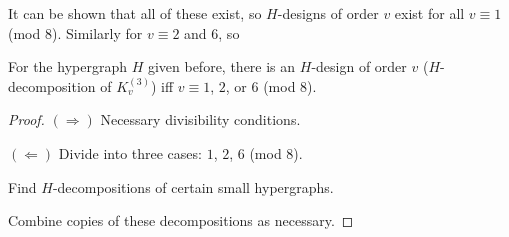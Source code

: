\begin{frame}
\begin{center}
\end{center}

\end{frame}

\begin{frame}

It can be shown that all of these exist, so $H$-designs of order $v$ exist for
all $v \equiv 1$ (mod $8$). Similarly for $v \equiv 2$ and $6$, so

\pause

\begin{theorem}
For the hypergraph $H$ given before, there is an $H$-design of order $v$
($H$-decomposition of $K_v^{(3)}$) iff $v \equiv 1$, $2$, or $6$ (mod $8$).
\end{theorem}

\pause

\begin{proof}
$(\Rightarrow)$ Necessary divisibility conditions.

$(\Leftarrow)$ Divide into three cases: $1$, $2$, $6$ (mod $8$).

Find $H$-decompositions of certain small hypergraphs.

Combine copies of these decompositions as necessary.
\end{proof}


\end{frame}



